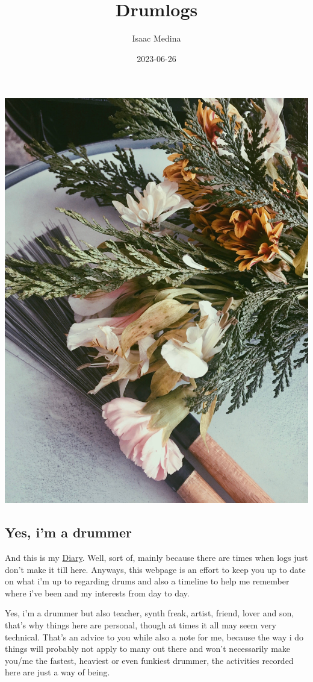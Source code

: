 \documentclass[
]{book}
\title{Drumlogs}
\author{Isaac Medina}
\date{2023-06-26}
\begin{document}
\maketitle

{
\setcounter{tocdepth}{1}
\tableofcontents
}
\hypertarget{section}{%
\chapter*{}\label{section}}

\begin{center}\includegraphics[width=0.6\linewidth]{images/flowerBrush1} \end{center}

\hypertarget{yes-im-a-drummer}{%
\section*{Yes, i'm a drummer}\label{yes-im-a-drummer}}

And this is my \protect\hyperlink{Diary}{Diary}. Well, sort of, mainly because there are times when logs just don't make it till here. Anyways, this webpage is an effort to keep you up to date on what i'm up to regarding drums and also a timeline to help me remember where i've been and my interests from day to day.

Yes, i'm a drummer but also teacher, synth freak, artist, friend, lover and son, that's why things here are personal, though at times it all may seem very technical. That's an advice to you while also a note for me, because the way i do things will probably not apply to many out there and won't necessarily make you/me the fastest, heaviest or even funkiest drummer, the activities recorded here are just a way of being.
\end{document}

